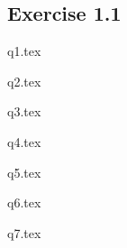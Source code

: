 \documentclass[fleqn]{article}
\begin{document}
    \subsection{Exercise 1.1}

    {q1.tex}
    \pagebreak

    {q2.tex}
    \pagebreak

    {q3.tex}
    \pagebreak

    {q4.tex}
    \pagebreak

    {q5.tex}
    \pagebreak

    {q6.tex}
    \pagebreak

    {q7.tex}
    \pagebreak
\end{document}
